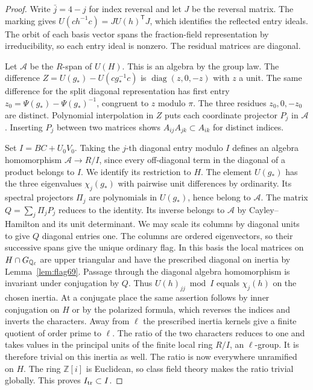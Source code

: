 \documentclass[a4paper,11pt]{article}
\theoremstyle{definition}
\theoremstyle{remark}
\newcommand{\ZZ}{\mathbb Z}\newcommand{\ord}{\operatorname{ord}}
\numberwithin{equation}{section}
\begin{document}
\begin{proof}
Write \(\bar j=4-j\) for index reversal and let \(J\) be the reversal
matrix. The marking gives \(U(ch^{-1}c)=JU(h)^{\mathsf T}J\), which
identifies the reflected entry ideals. The orbit of each basis vector
spans the fraction-field representation by irreducibility, so each
entry ideal is nonzero. The residual matrices are diagonal.

Let \(\mathcal A\) be the \(R\)-span of \(U(H)\). This is an algebra by
the group law. The difference \(Z=U(g_*)-U(cg_*^{-1}c)\) is
\(\operatorname{diag}(z,0,-z)\) with \(z\) a unit. The same difference
for the split diagonal representation has first entry
\(z_0=\Psi(g_*)-\Psi(g_*)^{-1}\), congruent to \(z\) modulo \(\pi\).
The three residues \(z_0,0,-z_0\) are distinct. Polynomial interpolation
in \(Z\) puts each coordinate projector \(P_j\) in \(\mathcal A\).
Inserting \(P_j\) between two matrices shows
\(A_{ij}A_{jk}\subset A_{ik}\) for distinct indices.

Set \(I=BC+U_0V_0\). Taking the \(j\)-th diagonal entry modulo \(I\)
defines an algebra homomorphism \(\mathcal A\to R/I\), since every
off-diagonal term in the diagonal of a product belongs to \(I\).
We identify its restriction to \(H\). The element \(U(g_*)\) has the
three eigenvalues \(\chi_j(g_*)\) with pairwise unit differences by
ordinarity. Its spectral projectors \(\Pi_j\) are polynomials in
\(U(g_*)\), hence belong to \(\mathcal A\). The matrix
\(Q=\sum_j\Pi_j P_j\) reduces to the identity. Its inverse belongs to
\(\mathcal A\) by Cayley--Hamilton and its unit determinant. We may
scale its columns by diagonal units to give \(Q\) diagonal entries one.
The columns are ordered eigenvectors, so their successive spans give
the unique ordinary flag. In this basis the local matrices on
\(H\cap G_{\mathbb Q_\ell}\) are upper triangular and have the prescribed
diagonal on inertia by Lemma~\ref{lem:flag69}. Passage through the
diagonal algebra homomorphism is invariant under conjugation by \(Q\).
Thus \(U(h)_{jj}\bmod I\) equals \(\chi_j(h)\) on the chosen inertia.
At a conjugate place the same assertion follows by inner conjugation
on \(H\) or by the polarized formula, which reverses the indices and
inverts the characters. Away from \(\ell\) the prescribed inertia
kernels give a finite quotient of order prime to \(\ell\). The ratio of
the two characters reduces to one and takes values in the principal
units of the finite local ring \(R/I\), an \(\ell\)-group. It is
therefore trivial on this inertia as well. The ratio is now everywhere
unramified on \(H\). The ring \(\ZZ[i]\) is Euclidean, so class field
theory makes the ratio trivial globally. This proves \(I_{\rm tr}\subset I\).


\end{proof}
\end{document}
